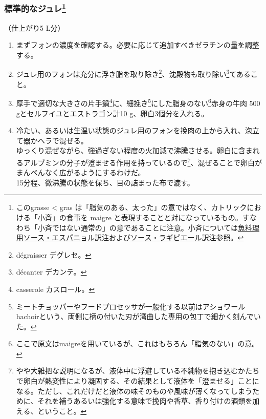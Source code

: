 
\begin{recette}
\hypertarget{gelees-ordinaires}{%
\subsubsection[標準的なジュレ]{\texorpdfstring{標準的なジュレ\footnote{このgrasse
  \textless{} gras
  は「脂気のある、太った」の意ではなく、カトリックにおける「小斉」の食事を
  maigre
  と表現することと対になっているもの。すなわち「小斉ではない通常の」の意であることに注意。小斉については\protect\hyperlink{sauce-espagnole-maigre}{魚料理用ソース・エスパニョル}訳注および\protect\hyperlink{sauce-laguipiere}{ソース・ラギピエール}訳注参照。}}{標準的なジュレ}}\label{gelees-ordinaires}}



（仕上がり5 L分）

\begin{enumerate}
\def\labelenumi{\arabic{enumi}.}
\item
  まずフォンの濃度を確認する。必要に応じて追加すべきゼラチンの量を調整する。
\item
  ジュレ用のフォンは充分に浮き脂を取り除き\footnote{dégraisser
    デグレセ。}、沈殿物も取り除い\footnote{décanter デカンテ。}てあること。
\item
  厚手で適切な大きさの片手鍋\footnote{casserole カスロール。}に、細挽き\footnote{ミートチョッパーやフードプロセッサが一般化する以前はアショワールhachoirという、両側に柄の付いた刃が湾曲した専用の包丁で細かく刻んでいた。}にした脂身のない\footnote{ここで原文はmaigreを用いているが、これはもちろん「脂気のない」の意。}赤身の牛肉
  500 gとセルフイユとエストラゴン計10 g、卵白3個分を入れる。
\item
  冷たい、あるいは生温い状態のジュレ用のフォンを挽肉の上から入れ、泡立て器かヘラで混ぜる。\\
  ゆっくり混ぜながら、強過ぎない程度の火加減で沸騰させる。卵白に含まれるアルブミンの分子が澄ませる作用を持っているので\footnote{やや大雑把な説明になるが、液体中に浮遊している不純物を抱き込むかたちで卵白が熱変性により凝固する、その結果として液体を「澄ませる」ことになる。ただし、これだけだと液体の味そのものや風味が薄くなってしまうために、それを補うあるいは強化する意味で挽肉や香草、香り付けの酒類を加える、ということ。}、混ぜることで卵白がまんべんなく広がるようにするわけだ。\\
  15分程、微沸騰の状態を保ち、目の詰まった布で漉す。
\end{enumerate}


\end{recette}

